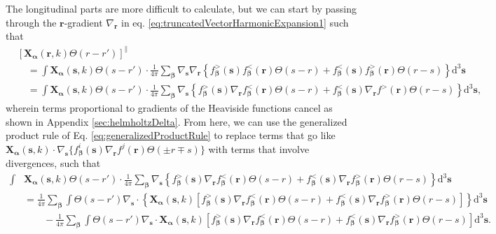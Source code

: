 \documentclass{article}
\begin{document}
The longitudinal parts are more difficult to calculate, but we can start by passing through the $\mathbf{r}$-gradient $\nabla_{\mathbf{r}}$ in eq. \eqref{eq:truncatedVectorHarmonicExpansion1} such that
\begin{equation}
\begin{split}
&\left[\mathbf{X}_{\bm{\alpha}}(\mathbf{r},k)\Theta(r - r')\right]^\parallel\\
&\quad = \int\mathbf{X}_{\bm{\alpha}}(\mathbf{s},k)\Theta(s - r')\cdot\frac{1}{4\pi}\sum_{\bm{\beta}}\nabla_{\mathbf{s}}\nabla_{\mathbf{r}}\left\{f_{\bm{\beta}}^>(\mathbf{s}) f_{\bm{\beta}}^<(\mathbf{r})\Theta(s - r) + f_{\bm{\beta}}^<(\mathbf{s})f_{\bm{\beta}}^>(\mathbf{r})\Theta(r - s)\right\}\mathrm{d}^3\mathbf{s}\\
&\quad = \int\mathbf{X}_{\bm{\alpha}}(\mathbf{s},k)\Theta(s - r')\cdot\frac{1}{4\pi}\sum_{\bm{\beta}}\nabla_{\mathbf{s}}\left\{f_{\bm{\beta}}^>(\mathbf{s})\nabla_{\mathbf{r}} f_{\bm{\beta}}^<(\mathbf{r})\Theta(s - r) + f_{\bm{\beta}}^<(\mathbf{s})\nabla_{\mathbf{r}}f^>(\mathbf{r})\Theta(r - s)\right\}\mathrm{d}^3\mathbf{s},
\end{split}
\end{equation}
wherein terms proportional to gradients of the Heaviside functions cancel as shown in Appendix \ref{sec:helmholtzDelta}. From here, we can use the generalized product rule of Eq. \eqref{eq:generalizedProductRule} to replace terms that go like $\mathbf{X}_{\bm{\alpha}}(\mathbf{s},k)\cdot\nabla_{\mathbf{s}}\{f_{\bm{\beta}}^i(\mathbf{s})\nabla_{\mathbf{r}}f^j(\mathbf{r})\Theta(\pm r \mp s)\}$ with terms that involve divergences, such that
\begin{equation}
\begin{split}
\int&\mathbf{X}_{\bm{\alpha}}(\mathbf{s},k)\Theta(s - r')\cdot\frac{1}{4\pi}\sum_{\bm{\beta}}\nabla_{\mathbf{s}}\left\{f_{\bm{\beta}}^>(\mathbf{s})\nabla_{\mathbf{r}} f_{\bm{\beta}}^<(\mathbf{r})\Theta(s - r) + f_{\bm{\beta}}^<(\mathbf{s})\nabla_{\mathbf{r}}f_{\bm{\beta}}^>(\mathbf{r})\Theta(r - s)\right\}\mathrm{d}^3\mathbf{s}\\
&= \frac{1}{4\pi}\sum_{\bm{\beta}}\int\Theta(s - r')\nabla_{\mathbf{s}}\cdot\left\{\mathbf{X}_{\bm{\alpha}}(\mathbf{s},k)\left[f_{\bm{\beta}}^>(\mathbf{s})\nabla_{\mathbf{r}}f_{\bm{\beta}}^<(\mathbf{r})\Theta(s - r) + f_{\bm{\beta}}^<(\mathbf{s})\nabla_{\mathbf{r}}f_{\bm{\beta}}^>(\mathbf{r})\Theta(r - s)\right]\right\}\mathrm{d}^3\mathbf{s}\\
&\qquad- \frac{1}{4\pi}\sum_{\bm{\beta}}\int\Theta(s - r')\nabla_{\mathbf{s}}\cdot\mathbf{X}_{\bm{\alpha}}(\mathbf{s},k)\left[f_{\bm{\beta}}^>(\mathbf{s})\nabla_{\mathbf{r}}f_{\bm{\beta}}^<(\mathbf{r})\Theta(s - r) + f_{\bm{\beta}}^<(\mathbf{s})\nabla_{\mathbf{r}}f_{\bm{\beta}}^>(\mathbf{r})\Theta(r - s)\right]\mathrm{d}^3\mathbf{s}.
\end{split}
\end{equation}
\end{document}
